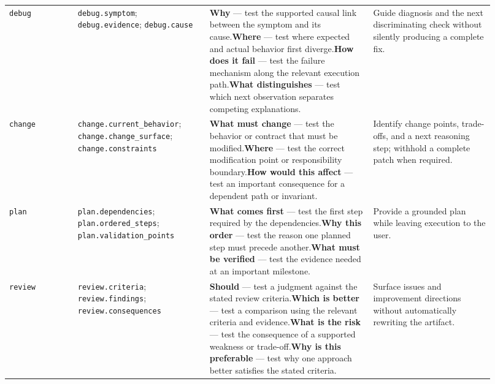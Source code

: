 \begin{landscape}
\begin{longtable}{@{}L{0.13\linewidth}L{0.25\linewidth}L{0.31\linewidth}L{0.23\linewidth}@{}}
\texttt{debug} & \texttt{debug.symptom}; \texttt{debug.evidence}; \texttt{debug.cause} & \textbf{Why} --- test the supported causal link between the symptom and its cause.\newline{}\textbf{Where} --- test where expected and actual behavior first diverge.\newline{}\textbf{How does it fail} --- test the failure mechanism along the relevant execution path.\newline{}\textbf{What distinguishes} --- test which next observation separates competing explanations. & Guide diagnosis and the next discriminating check without silently producing a complete fix. \\
\texttt{change} & \texttt{change.current\_behavior}; \texttt{change.change\_surface}; \texttt{change.constraints} & \textbf{What must change} --- test the behavior or contract that must be modified.\newline{}\textbf{Where} --- test the correct modification point or responsibility boundary.\newline{}\textbf{How would this affect} --- test an important consequence for a dependent path or invariant. & Identify change points, trade-offs, and a next reasoning step; withhold a complete patch when required. \\
\texttt{plan} & \texttt{plan.dependencies}; \texttt{plan.ordered\_steps}; \texttt{plan.validation\_points} & \textbf{What comes first} --- test the first step required by the dependencies.\newline{}\textbf{Why this order} --- test the reason one planned step must precede another.\newline{}\textbf{What must be verified} --- test the evidence needed at an important milestone. & Provide a grounded plan while leaving execution to the user. \\
\texttt{review} & \texttt{review.criteria}; \texttt{review.findings}; \texttt{review.consequences} & \textbf{Should} --- test a judgment against the stated review criteria.\newline{}\textbf{Which is better} --- test a comparison using the relevant criteria and evidence.\newline{}\textbf{What is the risk} --- test the consequence of a supported weakness or trade-off.\newline{}\textbf{Why is this preferable} --- test why one approach better satisfies the stated criteria. & Surface issues and improvement directions without automatically rewriting the artifact. \\

\end{longtable}
\end{landscape}
